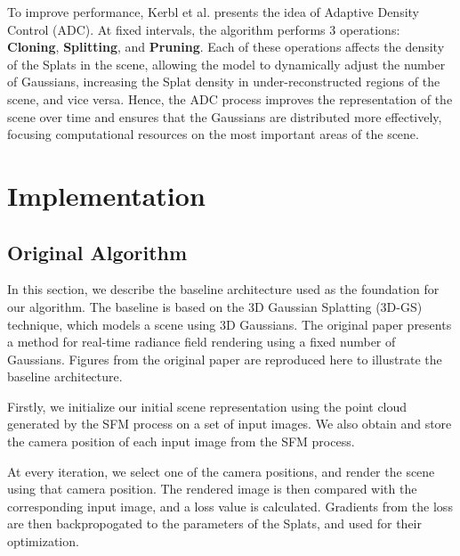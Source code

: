 \documentclass[11pt]{report}
\begin{document}
To improve performance, Kerbl et al. presents the idea of Adaptive Density Control (ADC). At fixed intervals, the algorithm performs 3 operations: \textbf{Cloning}, \textbf{Splitting}, and \textbf{Pruning}. Each of these operations affects the density of the Splats in the scene, allowing the model to dynamically adjust the number of Gaussians, increasing the Splat density in under-reconstructed regions of the scene, and vice versa. Hence, the ADC process improves the representation of the scene over time and ensures that the Gaussians are distributed more effectively, focusing computational resources on the most important areas of the scene.



\chapter{Implementation}

\section{Original Algorithm}
In this section, we describe the baseline architecture used as the foundation for our algorithm. The baseline is based on the 3D Gaussian Splatting (3D-GS) technique, which models a scene using 3D Gaussians. The original paper presents a method for real-time radiance field rendering using a fixed number of Gaussians. Figures from the original paper are reproduced here to illustrate the baseline architecture.

Firstly, we initialize our initial scene representation using the point cloud generated by the SFM process on a set of input images. We also obtain and store the camera position of each input image from the SFM process.

At every iteration, we select one of the camera positions, and render the scene using that camera position. The rendered image is then compared with the corresponding input image, and a loss value is calculated. Gradients from the loss are then backpropogated to the parameters of the Splats, and used for their optimization.
\end{document}
